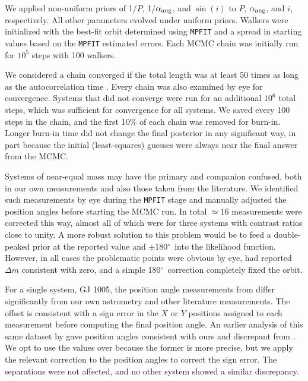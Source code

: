 \documentclass[twocolumn]{aastex62}
\newcommand{\degree}{$^{\circ}$}
\begin{document}
We applied non-uniform priors of 1/$P$, 1/$\alpha_{\rm{ang}}$, and $\sin(i)$ to $P$, $\alpha_{\rm{ang}}$, and $i$, respectively. All other parameters evolved under uniform priors. Walkers were initialized with the best-fit orbit determined using {\tt MPFIT} \citep{Markwart2009} and a spread in starting values based on the {\tt MPFIT} estimated errors. Each MCMC chain was initially run for $10^5$ steps with 100 walkers. 

We considered a chain converged if the total length was at least 50 times as long as the autocorrelation time \citep{2010CAMCS...5...65G}. Every chain was also examined by eye for convergence. Systems that did not converge were run for an additional $10^6$ total steps, which was sufficient for convergence for all systems. We saved every 100 steps in the chain, and the first 10\% of each chain was removed for burn-in. Longer burn-in time did not change the final posterior in any significant way, in part because the initial (least-squares) guesses were always near the final answer from the MCMC. 

Systems of near-equal mass may have the primary and companion confused, both in our own measurements and also those taken from the literature. We identified such measurements by eye during the {\tt MPFIT} stage and manually adjusted the position angles before starting the MCMC run. In total $\simeq$16 measurements were corrected this way, almost all of which were for three systems with contrast ratios close to unity. A more robust solution to this problem would be to feed a double-peaked prior at the reported value and $\pm$180\degree\ into the likelihood function. However, in all cases the problematic points were obvious by eye, had reported $\Delta m$ consistent with zero, and a simple 180\degree\ correction completely fixed the orbit. 

For a single system, GJ 1005, the position angle measurements from \citet{Benedict2016} differ significantly from our own astrometry and other literature measurements. The offset is consistent with a sign error in the $X$ or $Y$ positions assigned to each measurement before computing the final position angle. An earlier analysis of this same dataset by \citet{1998AJ....116.1440H} gave position angles consistent with ours and discrepant from \citet{Benedict2016}. We opt to use the \citet{Benedict2016} values over \citet{1998AJ....116.1440H} because the former is more precise, but we apply the relevant correction to the \citet{Benedict2016} position angles to correct the sign error. The separations were not affected, and no other system showed a similar discrepancy.
\end{document}
